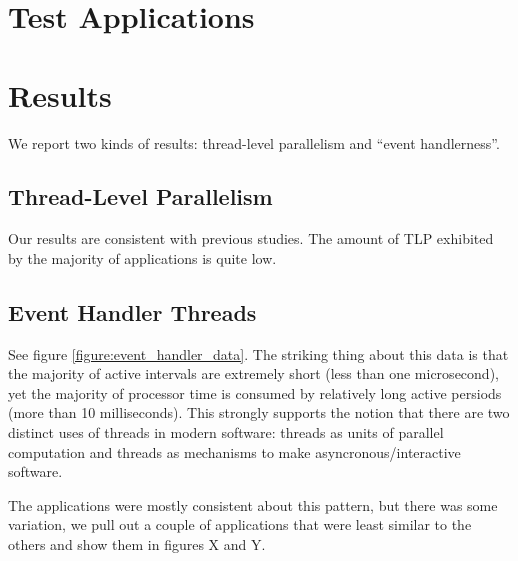 \documentclass[11pt]{sigplanconf}
\begin{document}
\section{Test Applications}




\section{Results}

We report two kinds of results: thread-level parallelism and ``event
handlerness''.

\subsection{Thread-Level Parallelism}

Our results are consistent with previous studies.  The amount of TLP
exhibited by the majority of applications is quite low.

\subsection{Event Handler Threads}

See figure \ref{figure:event_handler_data}.  The striking thing about
this data is that the majority of active intervals are extremely short
(less than one microsecond), yet the majority of processor time is
consumed by relatively long active persiods (more than 10 milliseconds).
This strongly supports the notion that there are two distinct uses of
threads in modern software: threads as units of parallel computation and
threads as mechanisms to make asyncronous/interactive software.

The applications were mostly consistent about this pattern, but there
was some variation, we pull out a couple of applications that were least
similar to the others and show them in figures X and Y.
\end{document}
